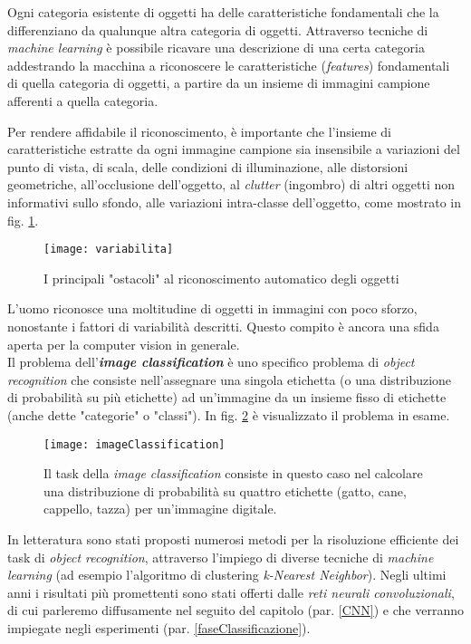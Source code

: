 Ogni categoria esistente di oggetti ha delle caratteristiche fondamentali che la differenziano da qualunque altra categoria di oggetti. Attraverso tecniche di \textit{machine learning} è possibile ricavare una descrizione di una certa categoria addestrando la macchina a riconoscere le caratteristiche (\textit{features}) fondamentali di quella categoria di oggetti, a partire da un insieme di immagini campione afferenti a quella categoria.

Per rendere affidabile il riconoscimento, è importante che l'insieme di caratteristiche estratte da ogni immagine campione sia insensibile a variazioni del punto di vista, di scala, delle condizioni di illuminazione, alle distorsioni geometriche, all'occlusione dell'oggetto, al \textit{clutter} (ingombro) di altri oggetti non informativi sullo sfondo, alle variazioni intra-classe dell'oggetto, come mostrato in fig. \ref{fig:variabilita}.

\begin{figure}[h]
\centering
\texttt{[image: variabilita]}
\caption{I principali "ostacoli" al riconoscimento automatico degli oggetti} 
\label{fig:variabilita}
\end{figure}

L'uomo riconosce una moltitudine di oggetti in immagini con poco sforzo, nonostante i fattori di variabilità descritti. Questo compito è ancora una sfida aperta per la computer vision in generale.\\

Il problema dell'\textbf{\textit{image classification}} è uno specifico problema di \textit{object recognition} che consiste nell'assegnare una singola etichetta (o una distribuzione di probabilità su più etichette) ad un'immagine da un insieme fisso di etichette (anche dette "categorie" o "classi"). In fig. \ref{fig:imageClassification} è visualizzato il problema in esame.

\begin{figure}[h]
\centering
\texttt{[image: imageClassification]}
\caption{Il task della \textit{image classification} consiste in questo caso nel calcolare una distribuzione di probabilità su quattro etichette (gatto, cane, cappello, tazza) per un'immagine digitale.} 
\label{fig:imageClassification}
\end{figure}

In letteratura sono stati proposti numerosi metodi per la risoluzione efficiente dei task di \textit{object recognition}, attraverso l'impiego di diverse tecniche di \textit{machine learning} (ad esempio l'algoritmo di clustering \textit{k-Nearest Neighbor}). Negli ultimi anni i risultati più promettenti sono stati offerti dalle \textit{reti neurali convoluzionali}, di cui parleremo diffusamente nel seguito del capitolo (par. \ref{CNN}) e che verranno impiegate negli esperimenti (par. \ref{faseClassificazione}).

